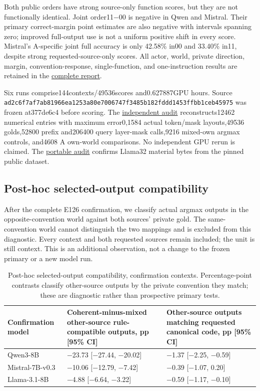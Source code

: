 \documentclass[11pt]{article}
\begin{document}
Both public orders have strong source-only function scores, but they are not functionally identical. Joint order11−00 is negative in Qwen and Mistral. Their primary correct-margin point estimates are also negative with intervals spanning zero; improved full-output use is not a uniform positive shift in every score. Mistral's A-specific joint full accuracy is only 42.58\% in00 and 33.40\% in11, despite strong requested-source-only scores. All actor, world, private direction, margin, convention-response, single-function, and one-instruction results are retained in the \href{results/e126/report.md}{complete report}.

Six runs comprise144contexts/49536scores and0.627887GPU hours. Source \texttt{ad2c6f7a\allowbreak{}f7ab8196\allowbreak{}6ea1253a\allowbreak{}80e70067\allowbreak{}47f3485b\allowbreak{}182fddd1\allowbreak{}453ffbb1\allowbreak{}ceb45975} was frozen at377de6c4 before scoring. The \href{results/e126/independent_review_2026-10-12.md}{independent audit} reconstructs12462 numerical entries with maximum error0,1584 actual token/mask layouts,49536 golds,52800 prefix and206400 query layer-mask calls,9216 mixed-own argmax controls, and4608 A own-world comparisons. No independent GPU rerun is claimed. The \href{results/e126/portable_reproduction_audit.json}{portable audit} confirms Llama32 material bytes from the pinned public dataset.

\subsection{Post-hoc selected-output compatibility}\label{post-hoc-selected-output-compatibility}

After the complete E126 confirmation, we classify actual argmax outputs in the opposite-convention world against both sources' private gold. The same-convention world cannot distinguish the two mappings and is excluded from this diagnostic. Every context and both requested sources remain included; the unit is still context. This is an additional observation, not a change to the frozen primary or a new model run.

\begin{table}[t]
\small
\begin{tabularx}{\textwidth}{>{\raggedright\arraybackslash}X>{\raggedleft\arraybackslash}X>{\raggedleft\arraybackslash}X}
\toprule
Confirmation model & Coherent-minus-mixed other-source rule-compatible outputs, pp {[}95\% CI{]} & Other-source outputs matching requested canonical code, pp {[}95\% CI{]} \\
\midrule
Qwen3-8B & −23.73 {[}−27.44, −20.02{]} & −1.37 {[}−2.25, −0.59{]} \\
Mistral-7B-v0.3 & −10.06 {[}−12.79, −7.42{]} & −0.39 {[}−1.07, 0.20{]} \\
Llama-3.1-8B & −4.88 {[}−6.64, −3.22{]} & −0.59 {[}−1.17, −0.10{]} \\
\bottomrule
\end{tabularx}
\caption{Post-hoc selected-output compatibility, confirmation contexts. Percentage-point contrasts classify other-source outputs by the private convention they match; these are diagnostic rather than prospective primary tests.}
\end{table}
\end{document}

